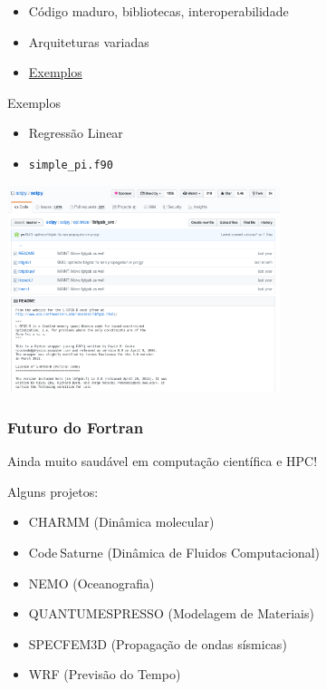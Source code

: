 \documentclass{beamer}
\begin{document}
\begin{darkframes}
\begin{frame}[label=features]
\begin{itemize}
    \item Código maduro, bibliotecas, interoperabilidade
    \item Arquiteturas variadas
    \item \href{https://github.com/scivision/fortran2018-examples}{Exemplos}
    \end{itemize}
  \end{frame}
  
  \begin{frame}[fragile]{Exemplos}
  \begin{itemize}
      \item Regressão Linear
      \item \verb+simple_pi.f90+
  \end{itemize}
  \begin{center}
      \includegraphics[width=8cm]{figures/lbfgsb.png}
  \end{center}
  \end{frame}
  
  \begin{frame}
    \frametitle{Futuro do Fortran}
    Ainda muito saudável em computação científica e HPC!

    \vfill
    Alguns projetos:
    \begin{itemize}
    \item CHARMM (Dinâmica molecular)
    \item Code$_{\ }$Saturne (Dinâmica de Fluidos Computacional)
    \item NEMO (Oceanografia)
    \item QUANTUMESPRESSO (Modelagem de Materiais)
    \item SPECFEM3D (Propagação de ondas sísmicas)
    \item WRF (Previsão do Tempo)
    \end{itemize}
  \end{frame}
  

\end{darkframes}
\end{document}
